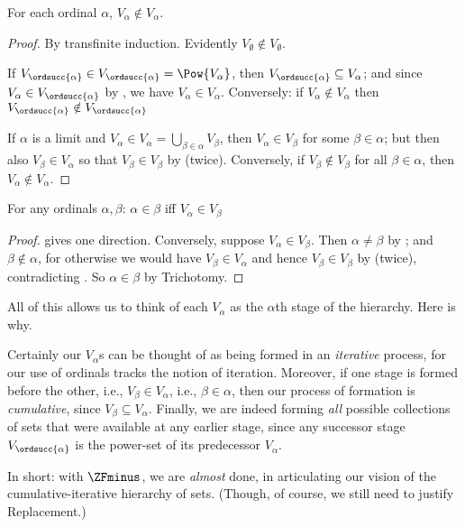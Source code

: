 \documentclass[../../../include/open-logic-section]{subfiles}
\begin{document}
\begin{lem}
For each ordinal $\alpha$, $V_\alpha \notin V_\alpha$.
\end{lem}

\begin{proof}
By transfinite induction. Evidently $V_\emptyset \notin V_\emptyset$. 

If $V_{\ordsucc{\alpha}} \in V_{\ordsucc{\alpha}} = \Pow{V_\alpha}$,
then $V_{\ordsucc{\alpha}} \subseteq V_\alpha$; and since $V_\alpha
\in V_{\ordsucc{\alpha}}$ by , we have
$V_\alpha \in V_\alpha$. Conversely: if $V_\alpha \notin V_\alpha$
then $V_{\ordsucc{\alpha}} \notin V_{\ordsucc{\alpha}}$

If $\alpha$ is a limit and $V_\alpha \in V_\alpha = \bigcup_{\beta \in
\alpha}V_\beta$, then $V_\alpha \in V_\beta$ for some $\beta \in
\alpha$; but then also $V_\beta \in V_\alpha$ so that $V_\beta \in
V_\beta$ by  (twice). Conversely, if $V_\beta
\notin V_\beta$ for all $\beta \in \alpha$, then $V_\alpha \notin
V_\alpha$.
\end{proof}

\begin{cor}
For any ordinals $\alpha, \beta$: $\alpha \in \beta$ iff $V_\alpha \in V_\beta$
\end{cor}

\begin{proof}
 gives one direction. Conversely, suppose $V_\alpha \in V_\beta$. Then $\alpha \neq \beta$ by ; and $\beta \notin \alpha$, for otherwise we would have $V_\beta \in V_\alpha$ and hence $V_\beta \in V_\beta$ by  (twice), contradicting . So $\alpha \in \beta$ by Trichotomy.
\end{proof}

All of this allows us to think of each $V_\alpha$ as the $\alpha$th
stage of the hierarchy. Here is why.

Certainly our $V_\alpha$s can be thought of as being formed in an
\emph{iterative} process, for our use of ordinals tracks the notion of
iteration. Moreover, if one stage is formed before the other, i.e.,
$V_\beta \in V_\alpha$, i.e., $\beta \in \alpha$, then our process of
formation is \emph{cumulative}, since $V_\beta \subseteq V_\alpha$.
Finally, we are indeed forming \emph{all} possible collections of sets
that were available at any earlier stage, since any successor stage
$V_{\ordsucc{\alpha}}$ is the power-set of its predecessor $V_\alpha$.

In short: with $\ZFminus$, we are \emph{almost} done, in articulating
our vision of the cumulative-iterative hierarchy of sets. (Though, of
course, we still need to justify Replacement.)
\end{document}
